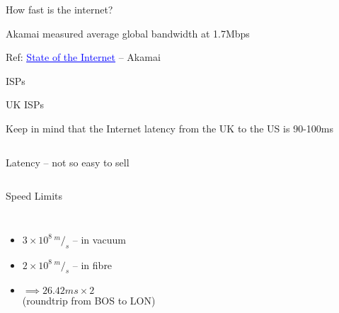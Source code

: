 \documentclass{beamer}
\begin{document}
\begin{frame}{How fast is the internet?}
  \begin{center}
  Akamai measured average global bandwidth at 1.7Mbps
  \end{center}
  \vfill
  \tiny{Ref: \href{http://www.akamai.com/stateoftheinternet/}{\textcolor{blue}{\underline{State of the Internet}}} -- Akamai}
\end{frame}

\begin{frame}{ISPs}
\end{frame}

\begin{frame}{UK ISPs}
  \parbox[c][1.5\paperheight]{\paperwidth} { }
  \tiny{Keep in mind that the Internet latency from the UK to the US is 90-100ms}
\end{frame}

\begin{frame}{}
  \begin{columns}[t]
  \begin{block}{}
  \begin{center}
  Latency -- not so easy to sell
  \end{center}
  \end{block}
  \end{columns}
\end{frame}

\begin{frame}{Speed Limits}
  \begin{columns}[t]
  \begin{itemize}
  \item $ 3 \times 10^8 \,^m/_s $ -- in vacuum
  \item $ 2 \times 10^8 \,^m/_s $ -- in fibre
  \item $ \implies 26.42ms \times 2 $ \\  (roundtrip from BOS to LON)
  \end{itemize}
  \end{columns}
\end{frame}
\end{document}
